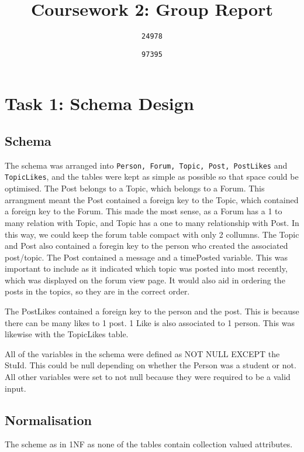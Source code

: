 \documentclass{article}
\begin{document}
\author{
	\texttt{24978}
	\and
	\texttt{97395}
}
\title{Coursework 2: Group Report}
\maketitle

\section*{Task 1: Schema Design}

\subsection*{Schema}

The schema was arranged into  \texttt{Person, Forum, Topic, Post, PostLikes} and \texttt{TopicLikes}, and the tables were kept as simple as possible so that space could be optimised.
The Post belongs to a Topic, which belongs to a Forum. This arrangment meant the Post contained a foreign key to the Topic, which contained a foreign key to the Forum. This made the most sense, as a Forum has a 1 to many relation with Topic, and Topic has a one to many relationship with Post. In this way, we could keep the forum table compact with only 2 collumns.
The Topic and Post also contained a foregin key to the person who created the associated post/topic.
The Post contained a message and a timePosted variable. This was important to include as it indicated which topic was posted into most recently, which was displayed on the forum view page. It would also aid in ordering the posts in the topics, so they are in the correct order.

The PostLikes contained a foreign key to the person and the post. This is because there can be many likes to 1 post. 1 Like is also associated to 1 person.
This was likewise with the TopicLikes table.

All of the variables in the schema were defined as NOT NULL EXCEPT the StuId. This could be null depending on whether the Person was a student or not. All other variables were set to not null because they were required to be a valid input.


\subsection*{Normalisation}

The scheme as in 1NF as none of the tables contain collection valued attributes. 
\end{document}
